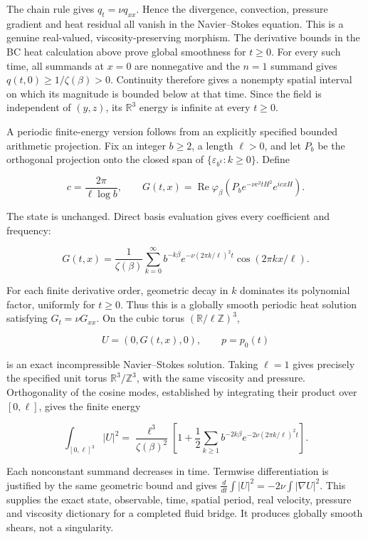 The chain rule gives \(q_t=\nu q_{xx}\). Hence the divergence, convection, pressure gradient and heat residual all vanish in the Navier--Stokes equation. This is a genuine real-valued, viscosity-preserving morphism. The derivative bounds in the BC heat calculation above prove global smoothness for \(t\ge 0\). For every such time, all summands at \(x=0\) are nonnegative and the \(n=1\) summand gives \(q(t,0)\ge1/\zeta(\beta)>0\). Continuity therefore gives a nonempty spatial interval on which its magnitude is bounded below at that time. Since the field is independent of \((y,z)\), its \(\mathbb R^3\) energy is infinite at every \(t\ge0\).

A periodic finite-energy version follows from an explicitly specified bounded arithmetic projection. Fix an integer \(b\ge 2\), a length \(\ell>0\), and let \(P_b\) be the orthogonal projection onto the closed span of \(\{\varepsilon_{b^k}:k\ge0\}\). Define

\[
c=\frac{2\pi}{\ell\log b},\qquad
G(t,x)=\operatorname{Re}\varphi_\beta
\left(P_b e^{-\nu c^2tH^2}e^{icxH}\right).
\]

The state is unchanged. Direct basis evaluation gives every coefficient and frequency:

\[
G(t,x)=\frac1{\zeta(\beta)}\sum_{k=0}^\infty
b^{-k\beta}e^{-\nu(2\pi k/\ell)^2t}
\cos(2\pi kx/\ell).
\]

For each finite derivative order, geometric decay in \(k\) dominates its polynomial factor, uniformly for \(t\ge 0\). Thus this is a globally smooth periodic heat solution satisfying \(G_t=\nu G_{xx}\). On the cubic torus \((\mathbb R/\ell\mathbb Z)^3\),

\[
U=(0,G(t,x),0),\qquad p=p_0(t)
\]

is an exact incompressible Navier--Stokes solution. Taking \(\ell=1\) gives precisely the specified unit torus \(\mathbb R^3/\mathbb Z^3\), with the same viscosity and pressure. Orthogonality of the cosine modes, established by integrating their product over \([0,\ell]\), gives the finite energy

\[
\int_{[0,\ell]^3}|U|^2
=\frac{\ell^3}{\zeta(\beta)^2}
\left[1+\frac12\sum_{k\ge1}b^{-2k\beta}
e^{-2\nu(2\pi k/\ell)^2t}\right].
\]

Each nonconstant summand decreases in time. Termwise differentiation is justified by the same geometric bound and gives \(\frac d{dt}\int|U|^2=-2\nu\int|\nabla U|^2\). This supplies the exact state, observable, time, spatial period, real velocity, pressure and viscosity dictionary for a completed fluid bridge. It produces globally smooth shears, not a singularity.

